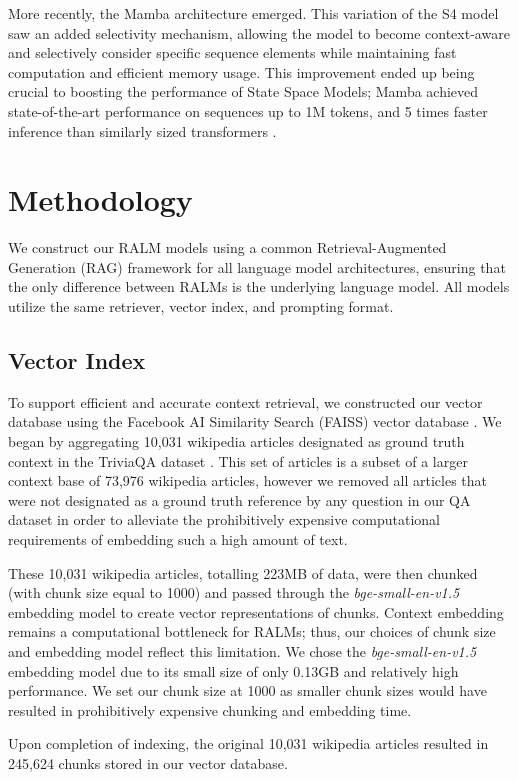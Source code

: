 \documentclass[11pt]{article}
\begin{document}
More recently, the Mamba architecture emerged. This variation of the S4 model saw an added selectivity mechanism, allowing the model to become context-aware and selectively consider specific sequence elements while maintaining fast computation and efficient memory usage. This improvement ended up being crucial to boosting the performance of State Space Models; Mamba achieved state-of-the-art performance on sequences up to 1M tokens, and 5 times faster inference than similarly sized transformers \cite{gu2023mamba}.

\section{Methodology}
We construct our RALM models using a common Retrieval-Augmented Generation (RAG) framework for all language model architectures, ensuring that the only difference between RALMs is the underlying language model. All models utilize the same retriever, vector index, and prompting format.
\subsection{Vector Index}
To support efficient and accurate context retrieval, we constructed our vector database using the Facebook AI Similarity Search (FAISS) vector database \cite{johnson2017billionscale}. 
We began by aggregating 10,031 wikipedia articles designated as ground truth context in the TriviaQA dataset \cite{Joshi2017TriviaQAAL}. This set of articles is a subset of a larger context base of 73,976 wikipedia articles, however we removed all articles that were not designated as a ground truth reference by any question in our QA dataset in order to alleviate the prohibitively expensive computational requirements of embedding such a high amount of text.

These 10,031 wikipedia articles, totalling 223MB of data, were then chunked (with chunk size equal to 1000) and passed through the \textit{bge-small-en-v1.5} embedding model \cite{bge_embedding} to create vector representations of chunks. Context embedding remains a computational bottleneck for RALMs; thus, our choices of chunk size and embedding model reflect this limitation. We chose the \textit{bge-small-en-v1.5} embedding model due to its small size of only 0.13GB and relatively high performance. We set our chunk size at 1000 as smaller chunk sizes would have resulted in prohibitively expensive chunking and embedding time.

Upon completion of indexing, the original 10,031 wikipedia articles resulted in 245,624 chunks stored in our vector database.
\end{document}

